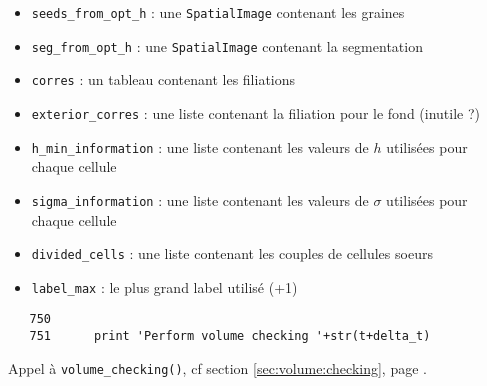 \documentclass{article}
\def \mycolor {red}
\begin{document}
\begin{itemize}
\itemsep -0.5ex
\item \verb|seeds_from_opt_h| : une \texttt{SpatialImage} contenant les graines 
\item \verb|seg_from_opt_h| : une \texttt{SpatialImage} contenant la segmentation
\item \verb|corres| : un tableau contenant les filiations
\item \verb|exterior_corres| : une liste contenant la filiation pour le fond (inutile ?)
\item \verb|h_min_information| : une liste contenant les valeurs de $h$ utilisées pour chaque cellule
\item \verb|sigma_information| : une liste contenant les valeurs de $\sigma$ utilisées pour chaque cellule
\item \verb|divided_cells| : une liste contenant les couples de cellules soeurs
\item \verb|label_max| : le plus grand label utilisé (+1)
\end{itemize}
\color{black}
\begin{verbatim}
   750	    
   751	    print 'Perform volume checking '+str(t+delta_t)
\end{verbatim} 
\color{\mycolor}
Appel \`a \texttt{volume\_checking()}, cf section \ref{sec:volume:checking}, page \pageref{sec:volume:checking}.
\end{document}
